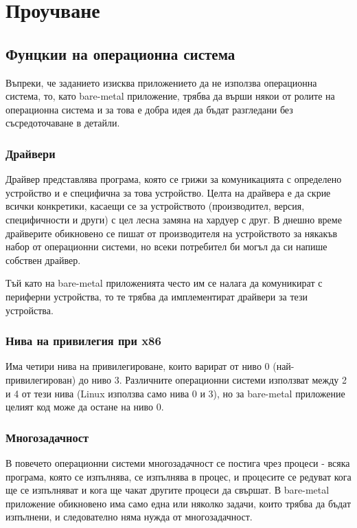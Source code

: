 \chapter{Проучване} %
\hfill
\section{Фунцкии на операционна система}
Въпреки, че заданието изисква приложението да не използва операционна система, то, като bare-metal приложение, трябва да върши някои от ролите на операционна система и за това е добра идея да бъдат разгледани без съсредоточаване в детайли.
  \subsection{Драйвери}
  Драйвер представлява програма, която се грижи за комуникацията с определено устройство и е специфична за това устройство. Целта на драйвера е да скрие всички конкретики, касаещи се за устройството (производител, версия, специфичности и други) с цел лесна замяна на хардуер с друг. В днешно време драйверите обикновено се пишат от производителя на устройството за някакъв набор от операционни системи, но всеки потребител би могъл да си напише собствен драйвер.

  Тъй като на bare-metal приложенията често им се налага да комуникират с периферни устройства, то те трябва да имплементират драйвери за тези устройства.

  \subsection{Нива на привилегия при x86} \label{rings}
  Има четири нива на привилегироване, които варират от ниво 0 (най-приви\-ле\-ги\-рован) до ниво 3. Различните операционни системи използват между 2 и 4 от тези нива (Linux използва само нива 0 и 3), но за bare-metal приложение целият код може да остане на ниво 0.

  \subsection{Многозадачност}
  В повечето операционни системи многозадачност се постига чрез процеси - всяка програма, която се изпълнява, се изпълнява в процес, и процесите се редуват кога ще се изпълняват и кога ще чакат другите процеси да свършат. В bare-metal приложение обикновено има само една или няколко задачи, които трябва да бъдат изпълнени, и следователно няма нужда от многозадачност.

